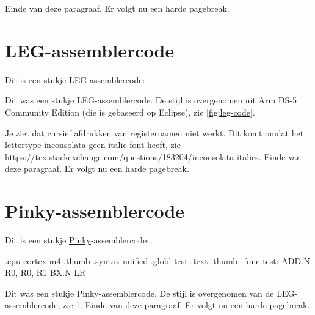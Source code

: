 \begin{llstShortInline}

Einde van deze paragraaf. 
Er volgt nu een harde pagebreak.

\clearpage
\section{LEG-assemblercode}
\label{legass}
Dit is een stukje LEG-assemblercode:
Dit was een stukje LEG-assemblercode. 
De stijl is overgenomen uit Arm DS-5 Community Edition (die is gebaseerd op Eclipse), zie \cref{fig:leg-code}.


Je ziet dat cursief afdrukken van registernamen niet werkt. 
Dit komt omdat het lettertype inconsolata geen italic font heeft, zie \url{https://tex.stackexchange.com/questions/183204/inconsolata-italics}. 
Einde van deze paragraaf. 
Er volgt nu een harde pagebreak.

\clearpage
\section{Pinky-assemblercode}
Dit is een stukje \href{https://github.com/HR-ELEKTRO/rts1/wiki/LEGv7/LEGv7-Pinky_ebook.pdf}{Pinky}-assemblercode:
\begin{lstfragment}[style=pinkystyle]
    .cpu cortex-m4
    .thumb
    .syntax unified
    .globl test
    .text
    .thumb_func
test:
    ADD.N   R0, R0, R1
    BX.N    LR
\end{lstfragment}
Dit was een stukje Pinky-assemblercode. 
De stijl is overgenomen van de LEG-assemblercode, zie \cref{legass}.
Einde van deze paragraaf. 
Er volgt nu een harde pagebreak.

\printbibliography[heading=bibintoc]{}
\backmatter
\end{llstShortInline}

